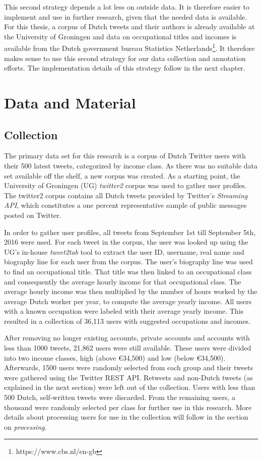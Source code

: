 \documentclass[
10pt, %
a4paper, %
oneside, %
headinclude,footinclude, %
] {book}%
\begin{document}
This second strategy depends a lot less on outside data. It is therefore easier to implement and use in further research, given that the needed data is available.  For this thesis, a corpus of Dutch tweets and their authors is already available at the University of Groningen and data on occupational titles and incomes is available from the Dutch government bureau Statistics Netherlands\footnote{https://www.cbs.nl/en-gb}. It therefore makes sense to use this second strategy for our data collection and annotation efforts. The implementation details of this strategy follow in the next chapter.

\chapter{Data and Material}
\label{datagathering}
\section{Collection} 
The primary data set for this research is a corpus of Dutch Twitter users with their 500 latest tweets, categorized by income class. As there was no suitable data set available off the shelf, a new corpus was created. As a starting point, the University of Groningen (UG) \textit{twitter2} corpus was used to gather user profiles. The twitter2 corpus contains all Dutch tweets provided by Twitter's \textit{Streaming API}, which constitutes a one percent representative sample of public messages posted on Twitter. 

In order to gather user profiles, all tweets from September 1st till September 5th, 2016 were used. For each tweet in the corpus, the user was looked up using the UG's in-house \textit{tweet2tab} tool to extract the user ID, username, real name and biography line for each user from the corpus. The user's biography line was used to find an occupational title. That title was then linked to an occupational class and consequently the average hourly income for that occupational class. The average hourly income was then multiplied by the number of hours worked by the average Dutch worker per year, to compute the average yearly income. All users with a known occupation were labeled with their average yearly income. This resulted in a collection of 36,113 users with suggested occupations and incomes.

After removing no longer existing accounts, private accounts and accounts with less than 1000 tweets, 21,862 users were still available. These users were divided into two income classes, high (above \euro 34,500) and low (below \euro 34,500). Afterwards, 1500 users were randomly selected from each group and their tweets were gathered using the Twitter REST API. Retweets and non-Dutch tweets (as explained in the next section) were left out of the collection. Users with less than 500 Dutch, self-written tweets were discarded. From the remaining users, a thousand were randomly selected per class for further use in this research. More details about processing users for use in the collection will follow in the section on \textit{processing}.
\end{document}
